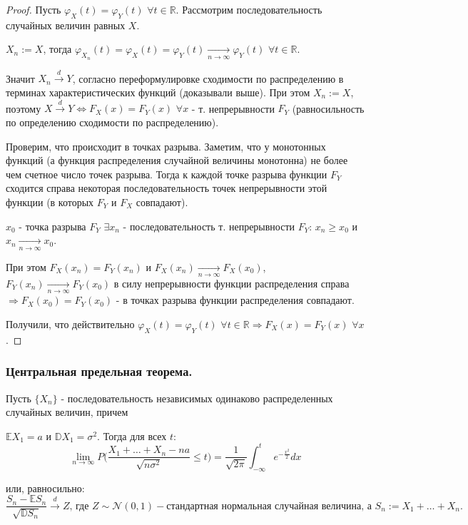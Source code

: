 \begin{proof}
    \text{}
    
    Пусть $\varphi_{X}(t) = \varphi_{Y}(t)$ $\forall t \in \mathbb{R}$. Рассмотрим последовательность случайных величин равных $X$.
    
    $X_n := X$, тогда $\varphi_{X_n}(t) = \varphi_{X}(t) = \varphi_{Y}(t) \xrightarrow[n \rightarrow \infty]{} \varphi_{Y}(t)$ $\forall t \in \mathbb{R}$.
    
    Значит $X_n \xrightarrow{d} Y$, согласно переформулировке сходимости по распределению в терминах характеристических функций (доказывали выше). При этом $X_n := X$, поэтому $X \xrightarrow{d} Y \Leftrightarrow F_X(x) = F_Y(x)$ $\forall x$ - т. непрерывности $F_Y$ (равносильность по определению сходимости по распределению).
    
    Проверим, что происходит в точках разрыва. Заметим, что у монотонных функций (а функция распределения случайной величины монотонна) не более чем счетное число точек разрыва. Тогда к каждой точке разрыва функции $F_Y$ сходится справа некоторая последовательность точек непрерывности этой функции (в которых $F_Y$ и $F_X$ совпадают).
    
    $x_0$ - точка разрыва $F_Y$ $\exists x_n$ - последовательность т. непрерывности $F_Y$: $x_n \geq x_0$ и $x_n \xrightarrow[n \rightarrow \infty]{} x_0$.
    
    При этом $F_X(x_n) = F_Y(x_n)$ и $F_X(x_n) \xrightarrow[n \rightarrow \infty]{} F_X(x_0)$, $F_Y(x_n) \xrightarrow[n \rightarrow \infty]{} F_Y(x_0)$ в силу непрерывности функции распределения справа $\Rightarrow F_X(x_0) = F_Y(x_0)$ - в точках разрыва функции распределения совпадают.
    
    Получили, что действительно $\varphi_{X}(t) = \varphi_{Y}(t)$ $\forall t \in \mathbb{R} \Rightarrow F_X(x) = F_Y(x)$ $\forall x$.
\end{proof}

\subsubsection{Центральная предельная теорема.}

\begin{theorem*}
    Пусть $\{X_n\}$ - последовательность независимых одинаково распределенных случайных величин, причем
    
    $\mathbb{E}X_1 = a$ и $\mathbb{D}X_1 = \sigma^2$. Тогда для всех $t$:
    $$\lim_{n \to \infty} P \Big( \frac{X_1 + \ldots + X_n - na}{\sqrt{n\sigma^2}} \leq t \Big) = \frac{1}{\sqrt{2\pi}} \int^{t}_{-\infty} e^{-\frac{x^2}{2}} dx$$
    
    или, равносильно:
    $$\frac{S_n - \mathbb{E}S_n}{\sqrt{\mathbb{D}S_n}} \xrightarrow{d} Z \textrm{, где } Z \sim \mathcal{N}(0, 1) - \textrm{стандартная нормальная случайная величина, а } S_n := X_1 + \ldots + X_n \textrm{.}$$
\end{theorem*}

